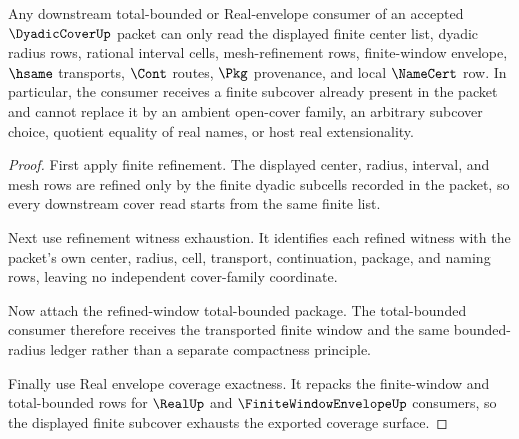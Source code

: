 \begin{theorem}
\label{thm:dyadic-cover-finite-subcover-exhaustion}
Any downstream total-bounded or Real-envelope consumer of an accepted
$\DyadicCoverUp$ packet can only read the displayed finite center list,
dyadic radius rows, rational interval cells, mesh-refinement rows,
finite-window envelope, $\hsame$ transports, $\Cont$ routes, $\Pkg$
provenance, and local $\NameCert$ row. In particular, the consumer receives a
finite subcover already present in the packet and cannot replace it by an
ambient open-cover family, an arbitrary subcover choice, quotient equality of
real names, or host real extensionality.
\end{theorem}
\begin{proof}
First apply finite refinement. The displayed center, radius, interval, and
mesh rows are refined only by the finite dyadic subcells recorded in the
packet, so every downstream cover read starts from the same finite list.

Next use refinement witness exhaustion. It identifies each refined witness
with the packet's own center, radius, cell, transport, continuation, package,
and naming rows, leaving no independent cover-family coordinate.

Now attach the refined-window total-bounded package. The total-bounded
consumer therefore receives the transported finite window and the same
bounded-radius ledger rather than a separate compactness principle.

Finally use Real envelope coverage exactness. It repacks the finite-window
and total-bounded rows for $\RealUp$ and $\FiniteWindowEnvelopeUp$ consumers,
so the displayed finite subcover exhausts the exported coverage surface.
\end{proof}

